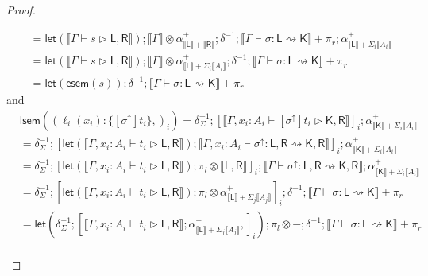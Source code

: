\documentclass[acmsmall,screen,review]{acmart}
\newcommand{\ms}[1]{\ensuremath{\mathsf{#1}}}
\newcommand{\lto}{:}
\newcommand{\wbranch}[3]{#1(#2) \lto \{#3\}}
\newcommand{\upg}[1]{{#1}^\uparrow}
\newcommand{\bhyp}[2]{#1 : #2}
\newcommand{\haslb}[3]{#1 \vdash #2 \rhd #3}
\newcommand{\lbsubst}[4]{#1 \vdash #2: #3 \rightsquigarrow #4}
\newcommand{\dnt}[1]{\llbracket{#1}\rrbracket}
\newcommand{\entrymor}[1]{\ms{esem}(#1)}
\newcommand{\loopmor}[1]{\ms{lsem}(#1)}
\newcommand{\lmor}[1]{\ms{let}(#1)}
\begin{document}
\begin{proof}
\begin{itemize}[leftmargin=*]
\begin{equation}
\begin{aligned}
        & = \lmor{\dnt{\haslb{\Gamma}{s}{\ms{L}, \ms{R}}}}
          ; \dnt{\Gamma} \otimes \alpha^+_{\dnt{\ms{L}} + \dnt{\ms{R}}} ; \delta^{-1} 
          ; \dnt{\lbsubst{\Gamma}{\sigma}{\ms{L}}{\ms{K}}} + \pi_r
          ; \alpha^+_{\dnt{\ms{L}} + \Sigma_i \dnt{A_i}} \\
        & = \lmor{\dnt{\haslb{\Gamma}{s}{\ms{L}, \ms{R}}}}
          ; \dnt{\Gamma} \otimes \alpha^+_{\dnt{\ms{L}} + \Sigma_i \dnt{A_i}} ; \delta^{-1} 
          ; \dnt{\lbsubst{\Gamma}{\sigma}{\ms{L}}{\ms{K}}} + \pi_r\\
        & = \lmor{\entrymor{s}} 
          ; \delta^{-1} ; \dnt{\lbsubst{\Gamma}{\sigma}{\ms{L}}{\ms{K}}} + \pi_r
      \end{aligned}
    \end{equation}
    and
    \begin{equation}
      \begin{aligned}       
        & \loopmor{(\wbranch{\ell_i}{x_i}{[\upg{\sigma}]t_i},)_i} 
          = \delta^{-1}_{\Sigma} 
          ; [ \dnt{\haslb{\Gamma, \bhyp{x_i}{A_i}}{[\upg{\sigma}]t_i}{\ms{K}, \ms{R}}} ]_i
          ; \alpha^+_{\dnt{\ms{K}} + \Sigma_i \dnt{A_i}} \\
        & = \delta^{-1}_{\Sigma} 
        ; [ 
            \lmor{\dnt{\haslb{\Gamma, \bhyp{x_i}{A_i}}{t_i}{\ms{L}, \ms{R}}}} 
            ; \dnt{\lbsubst{\Gamma, \bhyp{x_i}{A_i}}{\upg{\sigma}}{\ms{L}, \ms{R}}{\ms{K}, \ms{R}}}
          ]_i
        ; \alpha^+_{\dnt{\ms{K}} + \Sigma_i \dnt{A_i}} \\
        & = \delta^{-1}_{\Sigma} 
        ; [ 
            \lmor{\dnt{\haslb{\Gamma, \bhyp{x_i}{A_i}}{t_i}{\ms{L}, \ms{R}}}} 
            ; \pi_l \otimes \dnt{\ms{L}, \ms{R}}
          ]_i
        ; \dnt{\lbsubst{\Gamma}{\upg{\sigma}}{\ms{L}, \ms{R}}{\ms{K}, \ms{R}}}
        ; \alpha^+_{\dnt{\ms{K}} + \Sigma_i \dnt{A_i}} \\
        & = \delta^{-1}_{\Sigma} 
        ; [ 
            \lmor{\dnt{\haslb{\Gamma, \bhyp{x_i}{A_i}}{t_i}{\ms{L}, \ms{R}}}} 
            ; \pi_l \otimes \alpha^+_{\dnt{\ms{L}} + \Sigma_j \dnt{A_j}}
          ]_i
        ; \delta^{-1}
        ; \dnt{\lbsubst{\Gamma}{\sigma}{\ms{L}}{\ms{K}}} + \pi_r \\
        & = \lmor{
          \delta^{-1}_{\Sigma}
            ; [\dnt{\haslb{\Gamma, \bhyp{x_i}{A_i}}{t_i}{\ms{L}, \ms{R}}} 
                ; \alpha^+_{\dnt{\ms{L}} + \Sigma_j \dnt{A_j}},]_i }
          ; \pi_l \otimes -
          ; \delta^{-1} 
          ; \dnt{\lbsubst{\Gamma}{\sigma}{\ms{L}}{\ms{K}}} + \pi_r \\

\end{aligned}
\end{equation}
\end{itemize}
\end{proof}
\end{document}
